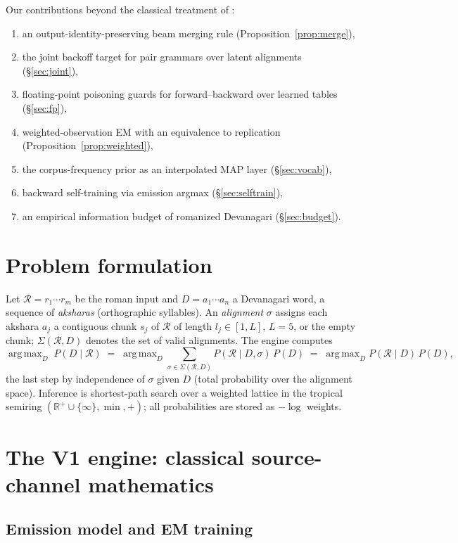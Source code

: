 \documentclass[11pt,a4paper]{article}
\newcommand{\R}{\mathcal{R}}
\newcommand{\Sg}{\Sigma}
\DeclareMathOperator*{\argmax}{arg\,max}
\begin{document}
Our contributions beyond the classical treatment of \citet{li2004}:
\begin{enumerate}
\item an output-identity-preserving beam merging rule (Proposition~\ref{prop:merge}),
\item the joint backoff target for pair grammars over latent alignments (\S\ref{sec:joint}),
\item floating-point poisoning guards for forward--backward over learned tables (\S\ref{sec:fp}),
\item weighted-observation EM with an equivalence to replication (Proposition~\ref{prop:weighted}),
\item the corpus-frequency prior as an interpolated MAP layer (\S\ref{sec:vocab}),
\item backward self-training via emission argmax (\S\ref{sec:selftrain}),
\item an empirical information budget of romanized Devanagari (\S\ref{sec:budget}).
\end{enumerate}

\section{Problem formulation}

Let $\R = r_1\cdots r_m$ be the roman input and $D = a_1\cdots a_n$ a
Devanagari word, a sequence of \emph{aksharas} (orthographic syllables).
An \emph{alignment} $\sigma$ assigns each akshara $a_j$ a contiguous chunk
$s_j$ of $\R$ of length $l_j \in [1, L]$, $L = 5$, or the empty chunk;
$\Sg(\R, D)$ denotes the set of valid alignments. The engine computes
\[
\argmax_D \; P(D \mid \R) \;=\; \argmax_D \sum_{\sigma \in \Sg(\R,D)}
P(\R \mid D, \sigma)\, P(D) \;=\; \argmax_D P(\R \mid D)\, P(D),
\]
the last step by independence of $\sigma$ given $D$ (total probability over
the alignment space). Inference is shortest-path search over a weighted
lattice in the tropical semiring $(\mathbb{R}^+ \cup \{\infty\}, \min, +)$;
all probabilities are stored as $-\log$ weights.

\section{The V1 engine: classical source-channel mathematics}

\subsection{Emission model and EM training}
\end{document}
